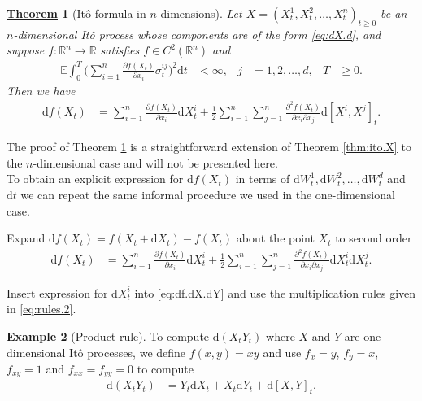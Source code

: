 \documentclass[12pt]{book}
\numberwithin{equation}{chapter}
\theoremstyle{plain}
\newtheorem{theorem}{\underline{Theorem}}
\numberwithin{theorem}{section}
\theoremstyle{definition}
\newtheorem{example}[theorem]{\underline{Example}}
\numberwithin{exercise}{chapter}
\newcommand{\<}{\langle}
\renewcommand{\>}{\rangle}
\renewcommand{\(}{\left(}
\renewcommand{\)}{\right)}
\renewcommand{\[}{\left[}
\renewcommand{\]}{\right]}
\newcommand\Eb{\mathds{E}}
\newcommand\Rb{\mathds{R}}
\newcommand\sig{\sigma}
\renewcommand\d{\partial}
\newcommand\dd{\mathrm{d}}
\begin{document}
\begin{theorem}[It\^o formula in $n$ dimensions]
\label{thm:ito.XY}
Let $X = (X_t^1, X_t^2, \ldots, X_t^n)_{t \geq 0}$ be an $n$-dimensional It\^o process whose components are of the form \eqref{eq:dX.d}, and suppose $f : \Rb^n \to \Rb$ satisfies $f \in C^2(\Rb^n)$ and
\begin{align}
\Eb \int_0^T \Big( \sum_{i=1}^n \frac{\d f(X_t)}{\d x_i} \sig_t^{ij} \Big)^2 \dd t
	&<	\infty , &
j
	&=	1, 2, \ldots, d , &
T
	&\geq 0 .
\end{align}
Then we have
\begin{align}
\dd f(X_t)
	&=	\sum_{i=1}^n \frac{\d f(X_t)}{\d x_i} \dd X_t^i + \frac{1}{2} \sum_{i=1}^n \sum_{j=1}^n \frac{\d^2 f(X_t)}{\d x_i \d x_j}  \dd[X^i,X^j]_t .
\end{align}
\end{theorem}

\noindent
The proof of Theorem \ref{thm:ito.XY} is a straightforward extension of Theorem \ref{thm:ito.X} to the $n$-dimensional case and will not be presented here.  
\\[0.5em]
To obtain an explicit expression for $\dd f(X_t)$ in terms of $\dd W_t^1, \dd W_t^2, \ldots, \dd W_t^d$ and $\dd t$ we can repeat the same informal procedure we used in the one-dimensional case.
\begin{enumerate*}
\item Expand $\dd f(X_t) = f(X_t + \dd X_t) - f(X_t)$ about the point $X_t$ to second order
\begin{align}
\dd f(X_t)
	&=	\sum_{i=1}^n \frac{\d f(X_t)}{\d x_i} \dd X_t^i + \frac{1}{2} \sum_{i=1}^n \sum_{j=1}^n \frac{\d^2 f(X_t)}{\d x_i \d x_j}  \dd X_t^i \dd X_t^j . \label{eq:df.dX.dY}
\end{align}
\item Insert expression for $\dd X_t^i$ into \eqref{eq:df.dX.dY} and use the multiplication rules given in \eqref{eq:rules.2}.
\end{enumerate*}

\begin{example}[Product rule]
To compute $\dd (X_t Y_t)$ where $X$ and $Y$ are one-dimensional It\^o processes, we define $f(x,y) = xy$ and use $f_x = y$, $f_y = x$, $f_{xy}=1$ and $f_{xx} = f_{yy} = 0$ to compute
\begin{align}
\dd (X_t Y_t)
	&=	Y_t \dd X_t + X_t \dd Y_t + \dd [X,Y]_t .
\end{align}
\end{example}
\end{document}
